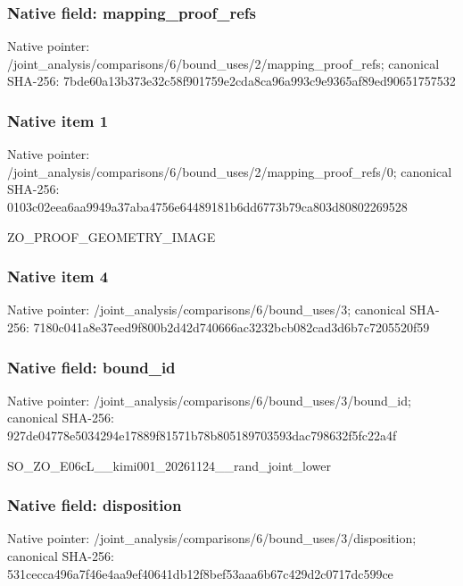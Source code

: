 \documentclass[10pt,a4paper]{article}
\begin{document}
\subsubsection{Native field: mapping\_proof\_refs}


Native pointer: /joint\_analysis/comparis\allowbreak{}ons/6/bound\_uses/2/mappi\allowbreak{}ng\_proof\_refs; canonical SHA-256: 7bde60a13b373e32c58f9017\allowbreak{}59e2cda8ca96a993c9e9365a\allowbreak{}f89ed90651757532



\subsubsection{Native item 1}


Native pointer: /joint\_analysis/comparis\allowbreak{}ons/6/bound\_uses/2/mappi\allowbreak{}ng\_proof\_refs/0; canonical SHA-256: 0103c02eea6aa9949a37aba4\allowbreak{}756e64489181b6dd6773b79c\allowbreak{}a803d80802269528


ZO\_PROOF\_GEOMETRY\_IMAGE


\subsubsection{Native item 4}


Native pointer: /joint\_analysis/comparis\allowbreak{}ons/6/bound\_uses/3; canonical SHA-256: 7180c041a8e37eed9f800b2d\allowbreak{}42d740666ac3232bcb082cad\allowbreak{}3d6b7c7205520f59



\subsubsection{Native field: bound\_id}


Native pointer: /joint\_analysis/comparis\allowbreak{}ons/6/bound\_uses/3/bound\allowbreak{}\_id; canonical SHA-256: 927de04778e5034294e17889\allowbreak{}f81571b78b805189703593da\allowbreak{}c798632f5fc22a4f


SO\_ZO\_E06cL\_\_kimi001\_202\allowbreak{}61124\_\_rand\_joint\_lower


\subsubsection{Native field: disposition}


Native pointer: /joint\_analysis/comparis\allowbreak{}ons/6/bound\_uses/3/dispo\allowbreak{}sition; canonical SHA-256: 531cecca496a7f46e4aa9ef4\allowbreak{}0641db12f8bef53aaa6b67c4\allowbreak{}29d2c0717dc599ce
\end{document}
